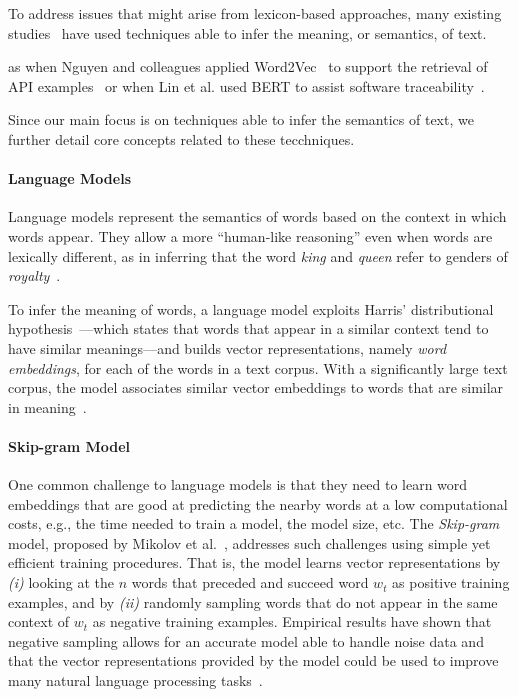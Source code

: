 To address issues that might arise from lexicon-based approaches,
many existing studies~\cite{silva2019, Huang2018, Ye2016, huang2018automating} have used techniques able to infer the meaning, or semantics, of text. 



 as  when Nguyen and colleagues
applied Word2Vec~\cite{Mikolov2013} to support the retrieval of API
examples~\cite{nguyen2017} or when Lin et al. used BERT to assist software traceability~\cite{Lin2021}. 


Since our main focus is on techniques able to infer the semantics of text, we further detail core concepts related to these tecchniques. 



\paragraph{\textbf{Language Models}}

Language models represent the semantics of words based on the context in which words appear. They allow a more ``human-like reasoning'' even when words are lexically different, as in inferring that the word \textit{king} and
\textit{queen} refer to genders of \textit{royalty}~\cite{Mikolov2013}.


To infer the meaning of words, a language model exploits Harris' distributional hypothesis~\cite{harris1954distributional}---which states that words that appear in a similar context tend to have similar meanings---and builds vector representations, namely \textit{word embeddings}, for each of the words in a text corpus.
With a significantly large text corpus, the model associates similar vector embeddings to words that are similar in meaning~\cite{Ye2016}. 





\paragraph{\textbf{Skip-gram Model}}
\label{cp5:skip-gram}

One common challenge to language models is that they need to learn word embeddings that are good at predicting the nearby words at a low computational costs, e.g., the time needed to train a model, the model size, etc.
The \textit{Skip-gram} model, proposed by Mikolov et al.~\cite{Mikolov2013}, addresses such challenges using simple yet efficient training procedures. 
That is, the model learns vector representations by \textit{(i)} looking at the $n$ words that preceded and succeed word $w_t$
as positive training examples, and by \textit{(ii)} randomly sampling words that do not appear in the same context of $w_t$ as negative training examples. 
Empirical results have shown that negative sampling allows for an accurate model able to handle noise data and that 
the vector representations provided by the model could be used to improve many natural language processing tasks~\cite{mikolov2013efficient}.


